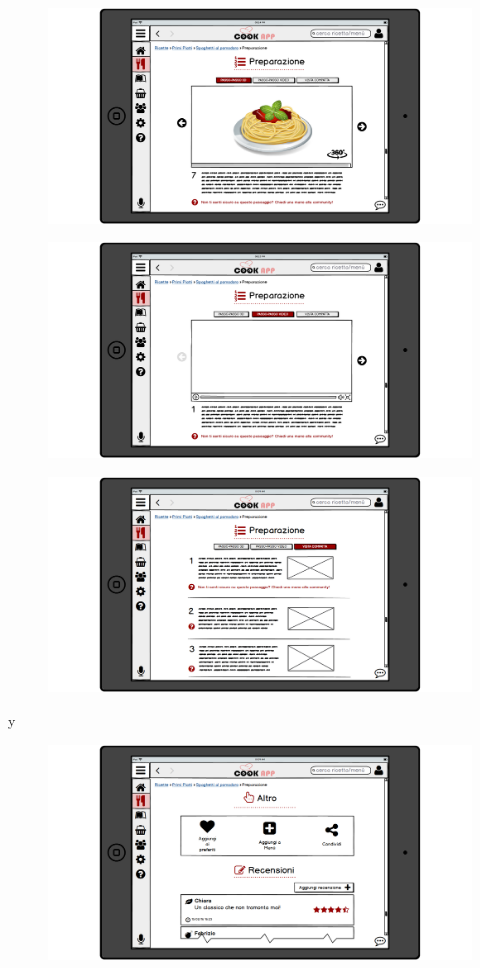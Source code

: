 \begin{figure}[H]
	\centering
	\includegraphics[width=0.95\linewidth]{img/mockup/Ricetta3.png}
\end{figure}
\begin{figure}[H]
	\centering
	\includegraphics[width=0.95\linewidth]{img/mockup/Ricetta4.png}
\end{figure}
\begin{figure}[H]
	\centering
	\includegraphics[width=0.95\linewidth]{img/mockup/Ricetta5.png}
\end{figure}
y\begin{figure}[H]
	\centering
	\includegraphics[width=0.95\linewidth]{img/mockup/Ricetta6.png}
\end{figure}

